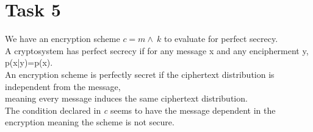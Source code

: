 \documentclass{article}
\begin{document}


\section{Task 5}
We have an encryption scheme \textbf{\textit{$c = m \wedge~k$}} to evaluate for perfect secrecy.\\
A cryptosystem has perfect secrecy if for any message x and any encipherment y, p(x|y)=p(x). \\
An encryption scheme is perfectly secret if the ciphertext distribution is independent from the message,\\meaning
every message induces the same ciphertext distribution. \\
The condition declared in \textit{c} seems to have the message dependent in the encryption meaning the scheme is not secure.

\end{document}
